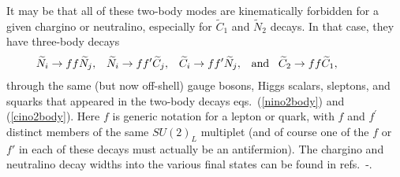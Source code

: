 \documentclass[11pt]{article}
\def\beq{\begin{eqnarray}}
\def\eeq{\end{eqnarray}}
\def\stilde{\widetilde}
\begin{document}
It may be that all of these two-body modes are kinematically forbidden for
a given chargino or neutralino, especially for $\stilde C_1$ and $\stilde
N_2$ decays. In that case, they have three-body decays
\beq
\stilde N_i \rightarrow f f \stilde N_j,\>\>\>\,
\stilde N_i \rightarrow f f^\prime \stilde C_j,\>\>\>\,
\stilde C_i \rightarrow f f^\prime \stilde N_j,\>\>\>\,{\rm and}\>\>\>\,
\stilde C_2 \rightarrow f f \stilde C_1,\qquad\>\>\>\>\>{}
\label{cino3body}
\eeq
through the same (but now off-shell) gauge bosons, Higgs scalars,
sleptons, and squarks that appeared in the two-body decays
eqs.~(\ref{nino2body}) and (\ref{cino2body}). Here $f$ is generic notation
for a lepton or quark, with $f$ and $f^\prime$ distinct members of the same
$SU(2)_L$ multiplet (and of course one of the $f$ or $f'$ in each of these
decays must actually be an antifermion).  The chargino and neutralino
decay widths into the various final states can be found in
refs.~\cite{inodecays}-\cite{neutralinoloopdecays}. 
\end{document}
